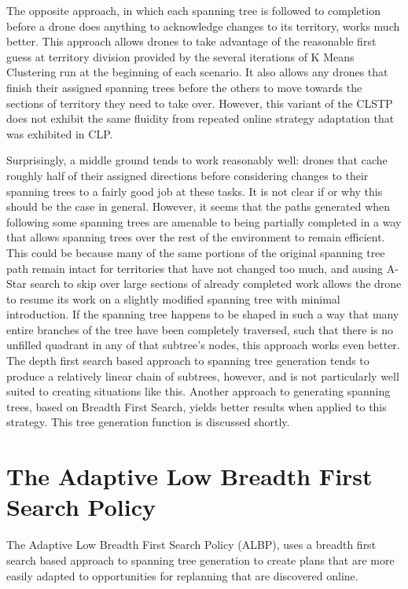 The opposite approach, in which each spanning tree is followed to completion before a drone does anything to acknowledge changes to its territory, works much better. This approach allows drones to take advantage of the reasonable first guess at territory division provided by the several iterations of K Means Clustering run at the beginning of each scenario. It also allows any drones that finish their assigned spanning trees before the others to move towards the sections of territory they need to take over. However, this variant of the CLSTP does not exhibit the same fluidity from repeated online strategy adaptation that was exhibited in CLP.

Surprisingly, a middle ground tends to work reasonably well: drones that cache roughly half of their assigned directions before considering changes to their spanning trees to a fairly good job at these tasks. It is not clear if or why this should be the case in general. However, it seems that the paths generated when following some spanning trees are amenable to being partially completed in a way that allows spanning trees over the rest of the environment to remain efficient. This could be because many of the same portions of the original spanning tree path remain intact for territories that have not changed too much, and ausing A-Star search to skip over large sections of already completed work allows the drone to resume its work on a slightly modified spanning tree with minimal introduction. If the spanning tree happens to be shaped in such a way that many entire branches of the tree have been completely traversed, such that there is no unfilled quadrant in any of that subtree's nodes, this approach works even better. The depth first search based approach to spanning tree generation tends to produce a relatively linear chain of subtrees, however, and is not particularly well suited to creating situations like this. Another approach to generating spanning trees, based on Breadth First Search, yields better results when applied to this strategy. This tree generation function is discussed shortly.

\section{The Adaptive Low Breadth First Search Policy}

The Adaptive Low Breadth First Search Policy (ALBP), uses a breadth first search based approach to spanning tree generation to create plans that are more easily adapted to opportunities for replanning that are discovered online.

